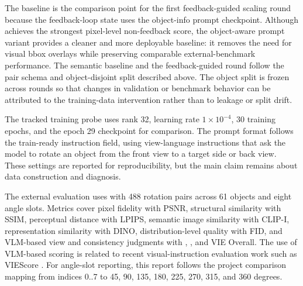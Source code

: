 The \semanticprobe{} baseline is the comparison point for the first feedback-guided scaling round because the feedback-loop state uses the object-info prompt checkpoint. Although \brightprobe{} achieves the strongest pixel-level non-feedback score, the object-aware prompt variant provides a cleaner and more deployable baseline: it removes the need for visual bbox overlays while preserving comparable external-benchmark performance. The semantic baseline and the feedback-guided round follow the pair schema and object-disjoint split described above. The object split is frozen across rounds so that changes in validation or benchmark behavior can be attributed to the training-data intervention rather than to leakage or split drift.

The tracked training probe uses rank 32, learning rate \(1\times10^{-4}\), 30 training epochs, and the epoch 29 checkpoint for comparison. The prompt format follows the train-ready instruction field, using view-language instructions that ask the model to rotate an object from the front view to a target side or back view. These settings are reported for reproducibility, but the main claim remains about data construction and diagnosis.

\begin{table}[t]
\centering
\small
\caption{Validation configurations. Feedback-Guided Scaling R1 changes only the train set; validation and test splits remain fixed and object-disjoint.}
\label{tab:dataset-stats}

\end{table}

The external evaluation uses \spatialedit{} \cite{xiao2026spatialedit} with 488 rotation pairs across 61 objects and eight angle slots. Metrics cover pixel fidelity with PSNR, structural similarity with SSIM, perceptual distance with LPIPS, semantic image similarity with CLIP-I, representation similarity with DINO, distribution-level quality with FID, and VLM-based view and consistency judgments with \scoreview{}, \scorecons{}, and VIE Overall. The use of VLM-based scoring is related to recent visual-instruction evaluation work such as VIEScore \cite{ku2024viescore}. For angle-slot reporting, this report follows the project comparison mapping from indices 0..7 to 45, 90, 135, 180, 225, 270, 315, and 360 degrees.
